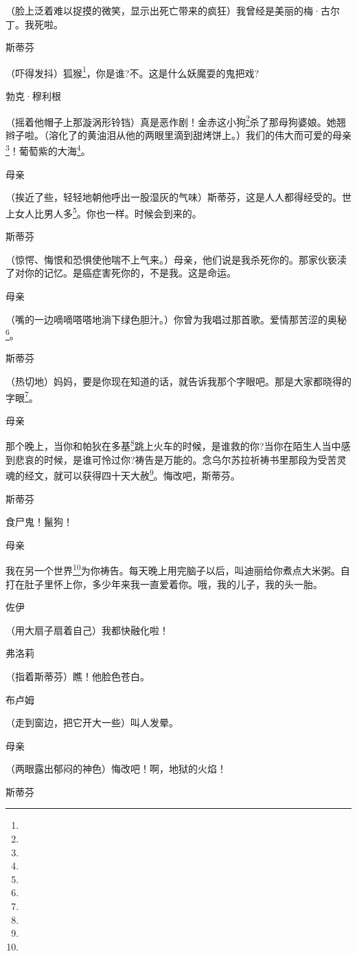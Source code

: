 \par （脸上泛着难以捉摸的微笑，显示出死亡带来的疯狂）我曾经是美丽的梅·古尔丁。我死啦。
\par 斯蒂芬
\par （吓得发抖）狐猴\footnote{}，你是谁?不。这是什么妖魔耍的鬼把戏?
\par 勃克·穆利根
\par （摇着他帽子上那漩涡形铃铛）真是恶作剧！金赤这小狗\footnote{}杀了那母狗婆娘。她翘辫子啦。（溶化了的黄油泪从他的两眼里滴到甜烤饼上。）我们的伟大而可爱的母亲\footnote{}！葡萄紫的大海\footnote{}。
\par 母亲
\par （挨近了些，轻轻地朝他呼出一股湿灰的气味）斯蒂芬，这是人人都得经受的。世上女人比男人多\footnote{}。你也一样。时候会到来的。
\par 斯蒂芬
\par （惊愕、悔恨和恐惧使他喘不上气来。）母亲，他们说是我杀死你的。那家伙亵渎了对你的记忆。是癌症害死你的，不是我。这是命运。
\par 母亲
\par （嘴的一边嘀嘀嗒嗒地淌下绿色胆汁。）你曾为我唱过那首歌。爱情那苦涩的奥秘\footnote{}。
\par 斯蒂芬
\par （热切地）妈妈，要是你现在知道的话，就告诉我那个字眼吧。那是大家都晓得的字眼\footnote{}。
\par 母亲
\par 那个晚上，当你和帕狄在多基\footnote{}跳上火车的时候，是谁救的你?当你在陌生人当中感到悲哀的时候，是谁可怜过你?祷告是万能的。念乌尔苏拉祈祷书里那段为受苦灵魂的经文，就可以获得四十天大赦\footnote{}。悔改吧，斯蒂芬。
\par 斯蒂芬
\par 食尸鬼！鬣狗！
\par 母亲
\par 我在另一个世界\footnote{}为你祷告。每天晚上用完脑子以后，叫迪丽给你煮点大米粥。自打在肚子里怀上你，多少年来我一直爱着你。哦，我的儿子，我的头一胎。
\par 佐伊
\par （用大扇子扇着自己）我都快融化啦！
\par 弗洛莉
\par （指着斯蒂芬）瞧！他脸色苍白。
\par 布卢姆
\par （走到窗边，把它开大一些）叫人发晕。
\par 母亲
\par （两眼露出郁闷的神色）悔改吧！啊，地狱的火焰！
\par 斯蒂芬
